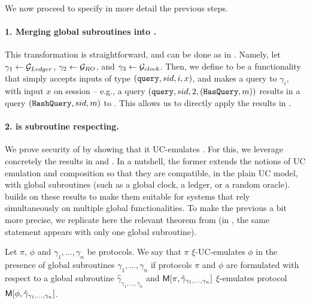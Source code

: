 We now proceed to specify in more detail the previous steps.

\paragraph{1. Merging global subroutines into \gAtala.} This transformation
is straightforward, and can be done as in \cite[Definition 4.1]{bhz21}. Namely,
let $\gamma_1 \gets \mathcal{G}_{Ledger}$, $\gamma_2 \gets \mathcal{G}_{RO}$, and $\gamma_3
\gets \mathcal{G}_{clock}$. Then, we define \gAtala to be a functionality that simply
accepts inputs of type $(\mathtt{query},sid,i,x)$, and makes a query to
$\gamma_i$, with input $x$ on session \sid -- e.g., a query $(\mathtt{query},
sid,2,(\mathtt{HasQuery},m))$ results in a query $(\mathtt{HashQuery},sid,m)$ to
\IdealGRO.
%
This allows us to directly apply the results in \cite{bch+20}. 

\paragraph{2. \gAtala is subroutine respecting.} 


We prove security of \RealPKIDIDAtala by showing that it UC-emulates
\IdealGPKIDID. For this, we leverage concretely the results in \cite{bch+20} and
\cite{bhz21}. In a nutshell, the former extends the notions of UC emulation and
composition so that they are compatible, in the plain UC model, with global
subroutines (such as a global clock, a ledger, or a random oracle).
\cite{bhz21} builds on these results to make them suitable for systems that rely
simultaneously on multiple global functionalities.
%
To make the previous a bit more precise, we replicate here the relevant theorem
from \cite{bhz21} (in \cite{bch+20}, the same statement appears with only one
global subroutine).

\begin{theorem}
  \label{thm:uc-bhz21}
  Let $\pi$, $\phi$ and $\gamma_1,\dots,\gamma_n$ be protocols. We say that
  $\pi$ $\xi$-UC-emulates $\phi$ in the presence of global subroutines
  $\gamma_1,\dots,\gamma_n$ if protocols $\pi$ and $\phi$ are formulated with
  respect to a global subroutine $\hat{\gamma}_{\gamma_1,\dots,\gamma_n}$ and
  $\mathsf{M}[\pi,\hat{\gamma}_{\gamma_1,\dots,\gamma_n}]$ $\xi$-emulates protocol
  $\mathsf{M}[\phi,\hat{\gamma}_{\gamma_1,\dots,\gamma_n}]$.
\end{theorem}

